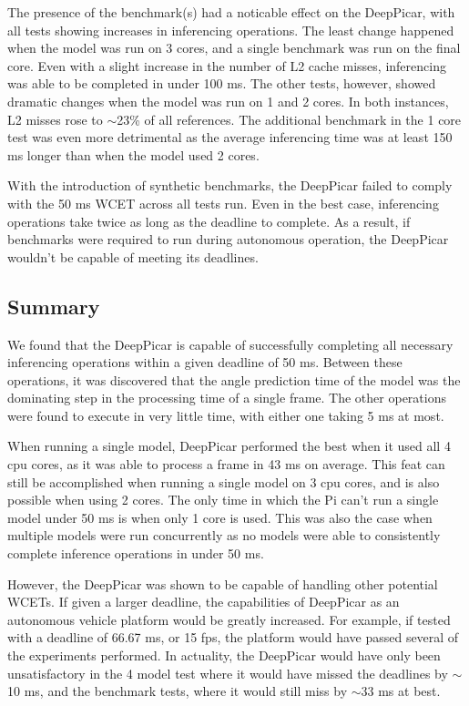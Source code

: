The presence of the benchmark(s) had a noticable effect on the DeepPicar, with all tests showing 
increases in inferencing operations. The least change happened when the model was run on 3 cores, and a 
single benchmark was run on the final core. Even with a slight increase in the number of L2 cache 
misses, inferencing was able to be completed in under 100 ms. The other tests, however, showed dramatic 
changes when the model was run on 1 and 2 cores. In both instances, L2 misses rose to $\sim$23\% of all 
references. The additional benchmark in the 1 core test was even more detrimental as the average 
inferencing time was at least 150 ms longer than when the model used 2 cores. 

With the introduction of synthetic benchmarks, the DeepPicar failed to comply with the 50 ms WCET across 
all tests run. Even in the best case, inferencing operations take twice as long as the deadline to 
complete. As a result, if benchmarks were required to run during autonomous operation, the DeepPicar 
wouldn't be capable of meeting its deadlines.

\subsection{Summary}
We found that the DeepPicar is capable of successfully completing all necessary inferencing 
operations within a given deadline of 50 ms. Between these operations, it was discovered that the 
angle prediction time of the model was the dominating step in the processing time of a single frame. 
The other operations were found to execute in very little time, with either one taking 5 ms at most.

When running a single model, DeepPicar performed the best when it used all 4 cpu cores, as it was 
able to process a frame in 43 ms on average. This feat can still be accomplished when running a 
single model on 3 cpu cores, and is also possible when using 2 cores. The only time in which the Pi 
can't run a single model under 50 ms is when only 1 core is used. This was also the case when 
multiple models were run concurrently as no models were able to consistently complete inference 
operations in under 50 ms.

However, the DeepPicar was shown to be capable of handling other potential WCETs. If given a larger 
deadline, the capabilities of DeepPicar as an autonomous vehicle platform would be greatly increased. 
For example, if tested with a deadline of 66.67 ms, or 15 fps, the platform would have passed several 
of the experiments performed. In actuality, the DeepPicar would have only been unsatisfactory in the 
4 model test where it would have missed the deadlines by $\sim$10 ms, and the benchmark tests, where 
it would still miss by $\sim$33 ms at best.

